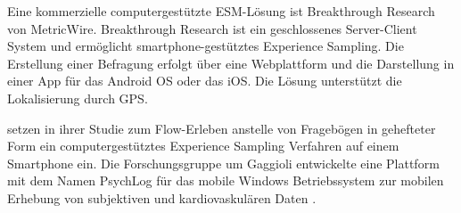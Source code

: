 Eine kommerzielle computergestützte \ac{ESM}-Lösung ist Breakthrough Research von MetricWire. Breakthrough Research ist ein geschlossenes Server-Client System und ermöglicht smartphone-gestütztes Experience Sampling. Die Erstellung einer Befragung erfolgt über eine Webplattform und die Darstellung in einer App für das Android OS oder das iOS. Die Lösung unterstützt die Lokalisierung durch \ac{GPS}.

\citet{Gaggioli2013} setzen in ihrer Studie zum Flow-Erleben anstelle von Fragebögen in gehefteter Form ein computergestütztes Experience Sampling Verfahren auf einem Smartphone ein. Die Forschungsgruppe um Gaggioli entwickelte eine Plattform mit dem Namen PsychLog für das mobile Windows Betriebssystem zur mobilen Erhebung von subjektiven und kardiovaskulären Daten \citep{Gaggioli2013a}.




